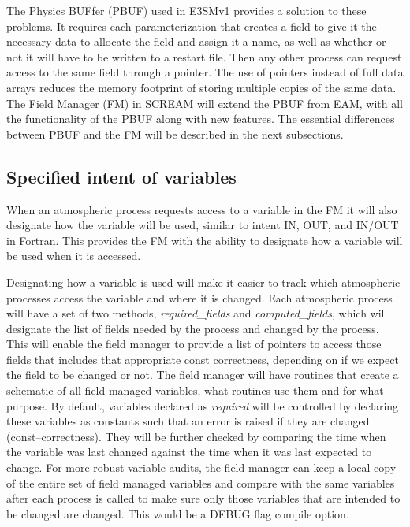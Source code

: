 \documentclass[10pt]{article}
\begin{document}
The Physics BUFfer (PBUF) used in E3SMv1 provides a solution to these problems. It requires each parameterization that creates a field to give it the necessary data to allocate the field and assign it a name, as well as whether or not it will have to be written to a restart file.  Then any other process can request access to the same field through a pointer.  The use of pointers instead of full data arrays reduces the memory footprint of storing multiple copies of the same data.  The Field Manager (FM) in SCREAM will extend the PBUF from EAM, with all the functionality of the PBUF along with new features.  The essential differences between PBUF and the FM will be described in the next subsections.

\subsection{Specified intent of variables}
When an atmospheric process requests access to a variable in the FM it will also designate how the variable will be used, similar to intent IN, OUT, and IN/OUT in Fortran. This provides the FM with the ability to designate how a variable will be used when it is accessed.  

Designating how a variable is used will make it easier to track which atmospheric processes access the variable and where it is changed.  Each atmospheric process will have a set of two methods, \emph{required\_fields} and \emph{computed\_fields}, which will designate the list of fields needed by the process and changed by the process.  This will enable the field manager to provide a list of pointers to access those fields that includes that appropriate const correctness, depending on if we expect the field to be changed or not.  The field manager will have routines that create a schematic of all field managed variables, what routines use them and for what purpose.    By default, variables declared as \emph{required} will be controlled by declaring these variables as constants such that an error is raised if they are changed (const--correctness).  They will be further checked by comparing the time when the variable was last changed against the time when it was last expected to change.  For more robust variable audits, the field manager can keep a local copy of the entire set of field managed variables and compare with the same variables after each process is called to make sure only those variables that are intended to be changed are changed.  This would be a DEBUG flag compile option.
\end{document}
